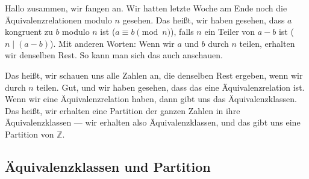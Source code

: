 \begin{spoken-clean}[00:00:00 - 00:01:57]
Hallo zusammen, wir fangen an.  Wir hatten letzte Woche am Ende noch die Äquivalenzrelationen modulo $n$ gesehen. Das heißt, wir haben gesehen, dass $a$ kongruent zu $b$ modulo $n$ ist ($a \equiv b \pmod n$), falls $n$ ein Teiler von $a - b$ ist ($n \mid (a - b)$). Mit anderen Worten: Wenn wir $a$ und $b$ durch $n$ teilen, erhalten wir denselben Rest. So kann man sich das auch anschauen.

Das heißt, wir schauen uns alle Zahlen an, die denselben Rest ergeben, wenn wir durch $n$ teilen. Gut, und wir haben gesehen, dass das eine Äquivalenzrelation ist. Wenn wir eine Äquivalenzrelation haben, dann gibt uns das Äquivalenzklassen. Das heißt, wir erhalten eine Partition der ganzen Zahlen in ihre Äquivalenzklassen --- wir erhalten also Äquivalenzklassen, und das gibt uns eine Partition von $\mathbb{Z}$.
\end{spoken-clean}

\begin{math-stroke}
\end{math-stroke}

\subsection{Äquivalenzklassen und Partition}

